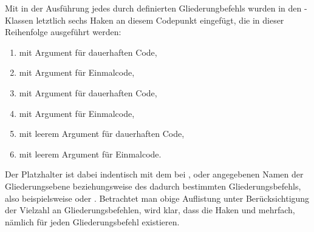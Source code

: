 \begin{Example}
  Mit %
   in der Ausführung jedes
  durch  definierten
  Gliederungbefehls wurden in den \KOMAScript-Klassen letztlich sechs Haken an
  diesem Codepunkt eingefügt, die in dieser Reihenfolge ausgeführt werden:
  \begin{enumerate}
  \item {} mit Argument  für
    dauerhaften Code,
  \item {} mit Argument  für
    Einmalcode,
  \item {} mit Argument  für
    dauerhaften Code,
  \item {} mit Argument  für
    Einmalcode,
  \item {} mit leerem Argument für
    dauerhaften Code,
  \item {} mit leerem Argument für
    Einmalcode.
  \end{enumerate}
  Der Platzhalter  ist dabei indentisch mit dem bei
  ,
   oder
  angegebenen Namen
  der Gliederungsebene beziehungsweise des dadurch bestimmten
  Gliederungsbefehls, also beispielsweise  oder
  . Betrachtet man obige Auflistung unter
  Berücksichtigung der Vielzahl an Gliederungsbefehlen,
  wird klar, dass die Haken  und 
  mehrfach, nämlich für jeden Gliederungsbefehl existieren.%
\end{Example}%
%
\EndIndexGroup
\ExampleEndFix


